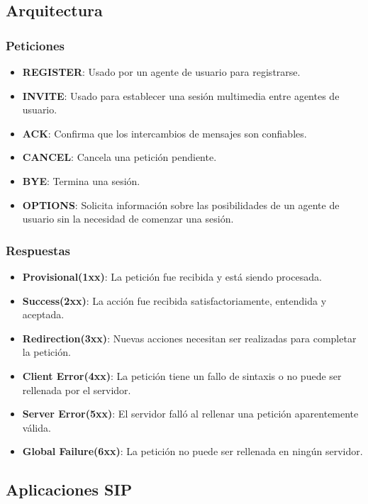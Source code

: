 \documentclass{beamer}
\begin{document}
\subsection{Arquitectura}
\begin{frame}
\frametitle{Peticiones}
		\begin{itemize}
			\item \textbf{REGISTER}: Usado por un agente de usuario para registrarse.
			\item \textbf{INVITE}: Usado para establecer una sesión multimedia entre agentes de usuario.
			\item \textbf{ACK}: Confirma que los intercambios de mensajes son confiables.
			\item \textbf{CANCEL}: Cancela una petición pendiente.
			\item \textbf{BYE}: Termina una sesión.
			\item \textbf{OPTIONS}: Solicita información sobre las posibilidades de un agente de usuario sin la necesidad de comenzar una sesión.
		\end{itemize}
\end{frame}
\begin{frame}
\frametitle{Respuestas}
\begin{itemize}
			\item \textbf{Provisional(1xx)}: La petición fue recibida y está siendo  procesada.
			\item \textbf{Success(2xx)}: La acción fue recibida satisfactoriamente, entendida y aceptada.
			\item \textbf{Redirection(3xx)}: Nuevas acciones necesitan ser realizadas para completar la petición.
			\item \textbf{Client Error(4xx)}: La petición tiene un fallo de sintaxis o no puede ser rellenada por el servidor.
			\item \textbf{Server Error(5xx)}: El servidor falló al rellenar una petición aparentemente válida.
			\item \textbf{Global Failure(6xx)}: La petición no puede ser rellenada en ningún servidor.
		\end{itemize}
\end{frame}
\subsection{Aplicaciones SIP}
\end{document}
